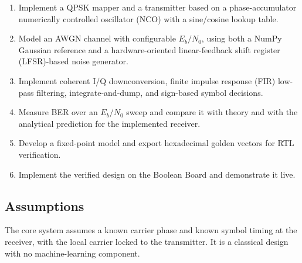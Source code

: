 \documentclass[10pt,twocolumn,letterpaper]{article}
\newcommand{\newend}{\endgroup}
\begin{document}
\begin{enumerate}
    \item Implement a QPSK mapper and a transmitter based on a phase-accumulator numerically controlled oscillator (NCO) with a sine/cosine lookup table.

    \item Model an AWGN channel with configurable $E_b/N_0$, using both a NumPy Gaussian reference and a hardware-oriented linear-feedback shift register (LFSR)-based noise generator.

    \item Implement coherent I/Q downconversion, finite impulse response (FIR) low-pass filtering, integrate-and-dump, and sign-based symbol decisions.

    \item Measure BER over an $E_b/N_0$ sweep and compare it with theory and with the analytical prediction for the implemented receiver.

    \item Develop a fixed-point model and export hexadecimal golden vectors for RTL verification.

    \item Implement the verified design on the Boolean Board and demonstrate it live.
\end{enumerate}

\subsection{Assumptions}
\label{sec:scope}

The core system assumes a known carrier phase and known symbol timing at the receiver, with the local carrier locked to the transmitter. It is a classical design with no machine-learning component.

\newend
\end{document}
